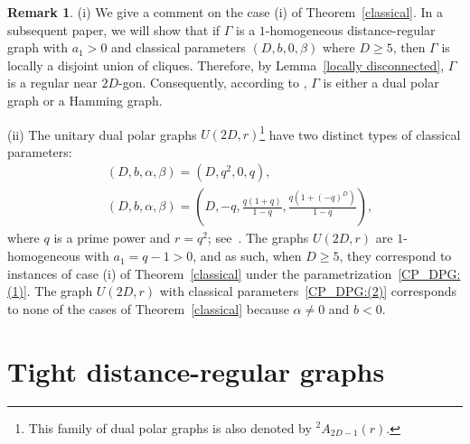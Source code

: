 \documentclass[11pt]{article}
\theoremstyle{definition}
\newtheorem{rema}[theo]{Remark}
\numberwithin{equation}{section}
\numberwithin{equation}{section}
\begin{document}
\begin{rema}
(i) We give a comment on the case (i) of Theorem~\ref{classical}. 
In a subsequent paper, we will show that if $\Gamma$ is a $1$-homogeneous distance-regular graph with $a_1>0$ and classical parameters $(D,b,0,\beta)$ where $D\geqslant 5$, then $\Gamma$ is locally a disjoint union of cliques. 
Therefore, by Lemma~\ref{locally disconnected}, $\Gamma$ is a regular near $2D$-gon. 
Consequently, according to {\cite[Theorem 9.4.4]{BCN}}, $\Gamma$ is either a dual polar graph or a Hamming graph. 

(ii) The unitary dual polar graphs $U(2D,r)$\footnote{This family of dual polar graphs is also denoted by ${}^2A_{2D-1}(r)$.} have two distinct types of classical parameters:
\begin{align}
	& (D, b, \alpha, \beta) = \left( D, q^2, 0, q \right), \label{CP_DPG:(1)}\\
	& (D, b, \alpha, \beta) = \left( D, -q, \frac{q(1+q)}{1-q}, \frac{q\left(1+(-q)^D\right)}{1-q}\right), \label{CP_DPG:(2)}
\end{align}
where $q$ is a prime power and $r = q^2$; see~\cite[Section 6.2]{BCN}.
The graphs $U(2D, r)$ are $1$-homogeneous with $a_1 = q - 1 > 0$, and as such, when $D \geqslant 5$, they correspond to instances of case (i) of Theorem~\ref{classical} under the parametrization~\eqref{CP_DPG:(1)}.
The graph $U(2D, r)$ with classical parameters~\eqref{CP_DPG:(2)} corresponds to none of the cases of Theorem~\ref{classical} because $\alpha \neq 0$ and $b < 0$.
\end{rema}

\section{Tight distance-regular graphs}\label{sec:tightDRGs}
\end{document}
